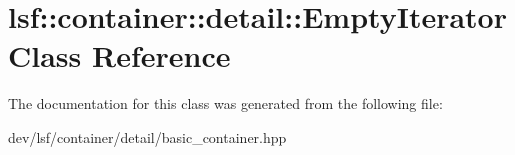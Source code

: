 \hypertarget{classlsf_1_1container_1_1detail_1_1EmptyIterator}{
\section{lsf::container::detail::EmptyIterator Class Reference}
\label{classlsf_1_1container_1_1detail_1_1EmptyIterator}
}


The documentation for this class was generated from the following file:\begin{DoxyCompactItemize}
\item 
dev/lsf/container/detail/basic\_\-container.hpp\end{DoxyCompactItemize}

